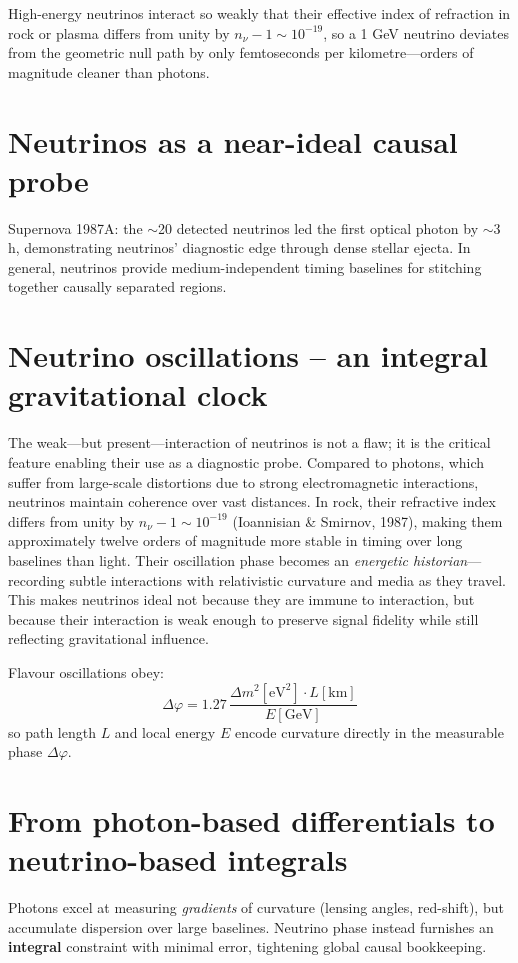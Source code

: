 \documentclass[12pt]{article}
\begin{document}
High-energy neutrinos interact so weakly that their effective index of refraction in rock or plasma differs from unity by $n_\nu - 1 \sim 10^{-19}$, so a 1 GeV neutrino deviates from the geometric null path by only femtoseconds per kilometre—orders of magnitude cleaner than photons.

\section{Neutrinos as a near-ideal causal probe}
Supernova 1987A: the $\sim$20 detected neutrinos led the first optical photon by $\sim$3 h, demonstrating neutrinos’ diagnostic edge through dense stellar ejecta. In general, neutrinos provide medium-independent timing baselines for stitching together causally separated regions.

\section{Neutrino oscillations – an integral gravitational clock}
The weak—but present—interaction of neutrinos is not a flaw; it is the critical feature enabling their use as a diagnostic probe. Compared to photons, which suffer from large-scale distortions due to strong electromagnetic interactions, neutrinos maintain coherence over vast distances. In rock, their refractive index differs from unity by $n_\nu - 1 \sim 10^{-19}$ (Ioannisian \& Smirnov, 1987), making them approximately twelve orders of magnitude more stable in timing over long baselines than light. Their oscillation phase becomes an \textit{energetic historian}—recording subtle interactions with relativistic curvature and media as they travel. This makes neutrinos ideal not because they are immune to interaction, but because their interaction is weak enough to preserve signal fidelity while still reflecting gravitational influence.

Flavour oscillations obey:
\[
\Delta \varphi = 1.27\,\frac{\Delta m^2 [\mathrm{eV}^2] \cdot L [\mathrm{km}]}{E [\mathrm{GeV}]}
\]
so path length $L$ and local energy $E$ encode curvature directly in the measurable phase $\Delta \varphi$.

\section{From photon-based differentials to neutrino-based integrals}
Photons excel at measuring \textit{gradients} of curvature (lensing angles, red-shift), but accumulate dispersion over large baselines. Neutrino phase instead furnishes an \textbf{integral} constraint with minimal error, tightening global causal bookkeeping.
\end{document}
